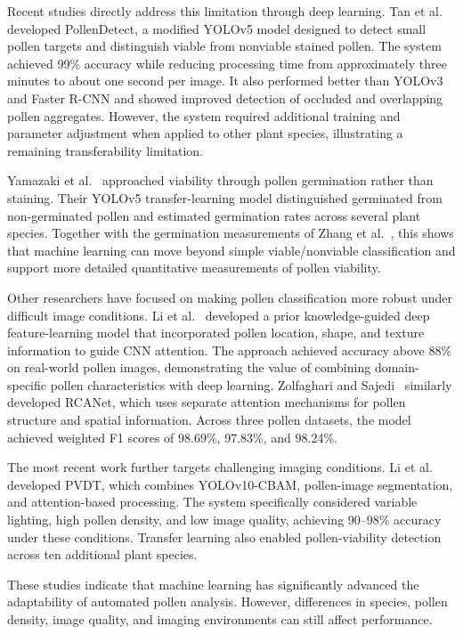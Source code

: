 Recent studies directly address this limitation through deep learning. Tan et al.~\cite{tan2022} developed PollenDetect, a modified YOLOv5 model designed to detect small pollen targets and distinguish viable from nonviable stained pollen. The system achieved 99\% accuracy while reducing processing time from approximately three minutes to about one second per image. It also performed better than YOLOv3 and Faster R-CNN and showed improved detection of occluded and overlapping pollen aggregates. However, the system required additional training and parameter adjustment when applied to other plant species, illustrating a remaining transferability limitation.

Yamazaki et al.~\cite{yamazaki2023} approached viability through pollen germination rather than staining. Their YOLOv5 transfer-learning model distinguished germinated from non-germinated pollen and estimated germination rates across several plant species. Together with the germination measurements of Zhang et al.~\cite{zhang2023}, this shows that machine learning can move beyond simple viable/nonviable classification and support more detailed quantitative measurements of pollen viability.

Other researchers have focused on making pollen classification more robust under difficult image conditions. Li et al.~\cite{li2024prior} developed a prior knowledge-guided deep feature-learning model that incorporated pollen location, shape, and texture information to guide CNN attention. The approach achieved accuracy above 88\% on real-world pollen images, demonstrating the value of combining domain-specific pollen characteristics with deep learning. Zolfaghari and Sajedi~\cite{zolfaghari2024} similarly developed RCANet, which uses separate attention mechanisms for pollen structure and spatial information. Across three pollen datasets, the model achieved weighted F1 scores of 98.69\%, 97.83\%, and 98.24\%.

The most recent work further targets challenging imaging conditions. Li et al.~\cite{li2026pvdt} developed PVDT, which combines YOLOv10-CBAM, pollen-image segmentation, and attention-based processing. The system specifically considered variable lighting, high pollen density, and low image quality, achieving 90--98\% accuracy under these conditions. Transfer learning also enabled pollen-viability detection across ten additional plant species.

These studies indicate that machine learning has significantly advanced the adaptability of automated pollen analysis. However, differences in species, pollen density, image quality, and imaging environments can still affect performance.

